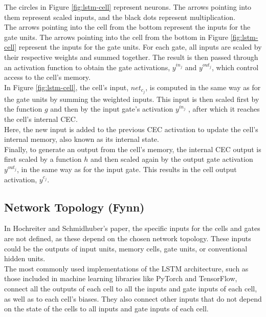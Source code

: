 \documentclass[twoside,a4paper,10pt,DIV=12,BCOR=12mm]{scrartcl}
\begin{document}
The circles in Figure \ref{fig:lstm-cell} represent neurons. The arrows pointing into them represent scaled inputs, and the black dots represent multiplication.\cite{hochreiter1997lstm} \\
The arrows pointing into the cell from the bottom represent the inputs for the gate units.
The arrows pointing into the cell from the bottom in Figure \ref{fig:lstm-cell} represent the inputs for the gate units. For each gate, all inputs are scaled by their respective weights and summed together. The result is then passed through an activation function to obtain the gate activations, $y^{in_j}$ and $y^{out_j}$, which control access to the cell's memory.\cite{hochreiter1997lstm} \\
In Figure \ref{fig:lstm-cell}, the cell's input, $net_{c_j}$, is computed in the same way as for the gate units by summing the weighted inputs. This input is then scaled first by the function $g$ and then by the input gate's activation $y^{in_j}$ , after which it reaches the cell's internal CEC. \cite{hochreiter1997lstm} \\
Here, the new input is added to the previous CEC activation to update the cell's internal memory, also known as its internal state.\cite{hochreiter1997lstm} \\
Finally, to generate an output from the cell's memory, the internal CEC output is first scaled by a function $h$ and then scaled again by the output gate activation $y^{out_j}$, in the same way as for the input gate. This results in the cell output activation, $y^{c_j}$.\cite{hochreiter1997lstm} 

\subsection{Network Topology (Fynn)}

In Hochreiter and Schmidhuber's paper, the specific inputs for the cells and gates are not defined, as these depend on the chosen network topology. These inputs could be the outputs of input units, memory cells, gate units, or conventional hidden units.\cite{hochreiter1997lstm}\\
The most commonly used implementations of the LSTM architecture, such as those included in machine learning libraries like PyTorch and TensorFlow, connect all the outputs of each cell to all the inputs and gate inputs of each cell, as well as to each cell's biases. They also connect other inputs that do not depend on the state of the cells to all inputs and gate inputs of each cell.\cite{smagulova2019notation, keras-lstm, real-pytorch-lstm, pytorch-lstm}
\end{document}
